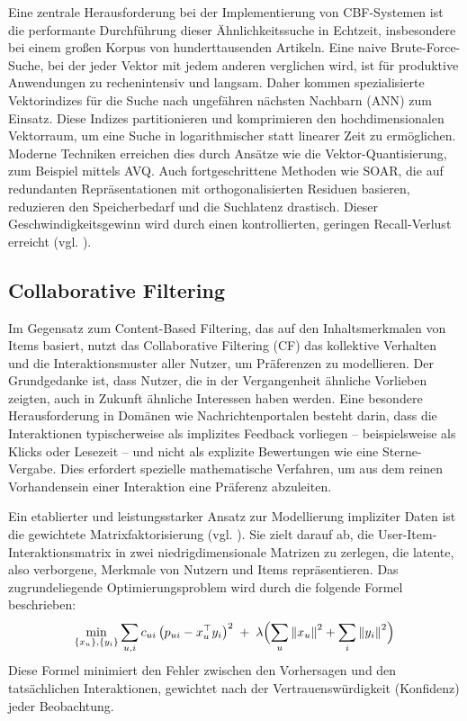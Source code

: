 Eine zentrale Herausforderung bei der Implementierung von CBF-Systemen ist die performante Durchführung 
dieser Ähnlichkeitssuche in Echtzeit, insbesondere bei einem großen Korpus von hunderttausenden Artikeln. 
Eine naive Brute-Force-Suche, bei der jeder Vektor mit jedem anderen verglichen wird, ist für produktive Anwendungen 
zu rechenintensiv und langsam. Daher kommen spezialisierte Vektorindizes für die Suche nach 
ungefähren nächsten Nachbarn (\ac{ANN}) zum Einsatz. Diese Indizes partitionieren und komprimieren 
den hochdimensionalen Vektorraum, um eine Suche in logarithmischer statt linearer Zeit zu ermöglichen. 
Moderne Techniken erreichen dies durch Ansätze wie die Vektor-Quantisierung, zum Beispiel mittels 
\ac{AVQ}. Auch fortgeschrittene Methoden wie \ac{SOAR}, die auf redundanten Repräsentationen mit 
orthogonalisierten Residuen basieren, reduzieren den Speicherbedarf und die Suchlatenz drastisch. 
Dieser Geschwindigkeitsgewinn wird durch einen kontrollierten, geringen Recall-Verlust erreicht
(vgl. \cite{avq_2020, soar_2023}).

\subsection{Collaborative Filtering}
\label{sec:cf}

Im Gegensatz zum Content-Based Filtering, das auf den Inhaltsmerkmalen von Items basiert, 
nutzt das Collaborative Filtering (CF) das kollektive Verhalten und die Interaktionsmuster 
aller Nutzer, um Präferenzen zu modellieren. Der Grundgedanke ist, dass Nutzer, die in der 
Vergangenheit ähnliche Vorlieben zeigten, auch in Zukunft ähnliche Interessen haben werden. 
Eine besondere Herausforderung in Domänen wie Nachrichtenportalen besteht darin, dass die 
Interaktionen typischerweise als implizites Feedback vorliegen – beispielsweise als Klicks 
oder Lesezeit – und nicht als explizite Bewertungen wie eine Sterne-Vergabe. Dies erfordert 
spezielle mathematische Verfahren, um aus dem reinen Vorhandensein einer Interaktion eine 
Präferenz abzuleiten.

Ein etablierter und leistungsstarker Ansatz zur Modellierung impliziter Daten ist die 
gewichtete Matrixfaktorisierung (vgl. \cite{hu_collaborative_2008}). Sie zielt 
darauf ab, die User-Item-Interaktionsmatrix in zwei niedrigdimensionale Matrizen zu 
zerlegen, die latente, also verborgene, Merkmale von Nutzern und Items repräsentieren. 
Das zugrundeliegende Optimierungsproblem wird durch die folgende Formel beschrieben:
\begin{equation}
\label{eq:cf}
\min_{\{x_u\},\{y_i\}} \sum_{u,i} c_{ui}\,\bigl(p_{ui} - x_u^\top y_i\bigr)^2 \;+\; \lambda \Bigl(\sum_u \left\lVert x_u\right\rVert^2 + \sum_i \left\lVert y_i\right\rVert^2\Bigr)
\end{equation}
Diese Formel minimiert den Fehler zwischen den Vorhersagen und den tatsächlichen 
Interaktionen, gewichtet nach der Vertrauenswürdigkeit (Konfidenz) jeder Beobachtung.

